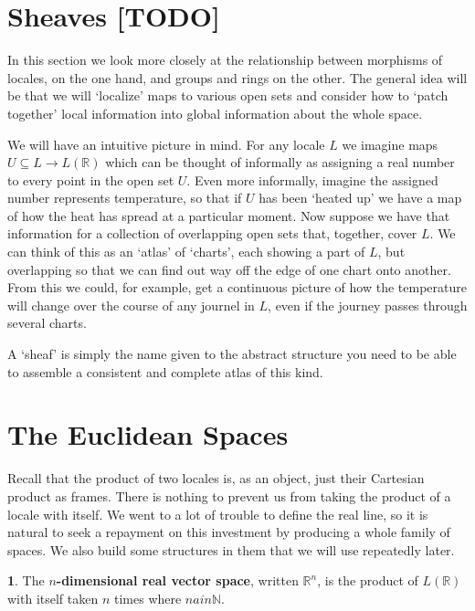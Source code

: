 \documentclass[oneside,english]{amsbook}
\numberwithin{section}{chapter}
\theoremstyle{plain}
\theoremstyle{definition}
\newtheorem{defn}[thm]{\protect\definitionname}
\providecommand{\definitionname}{Definition}
\begin{document}
\section{Sheaves [TODO]}

In this section we look more closely at the relationship between morphisms of locales, on the one hand, and groups and rings on the other. The general idea will be that we will `localize' maps to various open sets and consider how to `patch together' local information into global information about the whole space.

We will have an intuitive picture in mind. For any locale $L$ we imagine maps $U\subseteq L\to L(\mathbb{R})$ which can be thought of informally as assigning a real number to every point in the open set $U$. Even more informally, imagine the assigned number represents temperature, so that if $U$ has been `heated up' we have a map of how the heat has spread at a particular moment. Now suppose we have that information for a collection of overlapping open sets that, together, cover $L$. We can think of this as an `atlas' of `charts', each showing a part of $L$, but overlapping so that we can find out way off the edge of one chart onto another. From this we could, for example, get a continuous picture of how the temperature will change over the course of any journel in $L$, even if the journey passes through several charts.

A `sheaf' is simply the name given to the abstract structure you need to be able to assemble a consistent and complete atlas of this kind.






\section{The Euclidean Spaces}

Recall that the product of two locales is, as an object, just their Cartesian product as frames. There is nothing to prevent us from taking the product of a locale with itself. We went to a lot of trouble to define the real line, so it is natural to seek a repayment on this investment by producing a whole family of spaces. We also build some structures in them that we will use repeatedly later.

\begin{defn}
	The \textbf{$n$-dimensional real vector space}, written $\mathbb{R}^n$, is the product of $L(\mathbb{R})$ with itself taken $n$ times where $nain \mathbb{N}$.
\end{defn}
\end{document}
